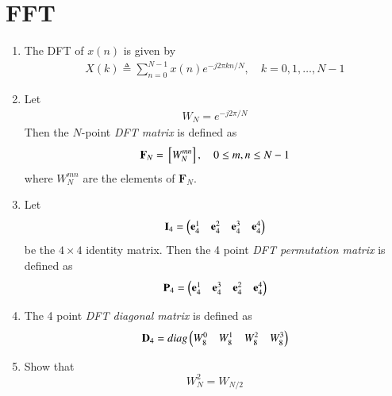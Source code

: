 \documentclass[journal,12pt,twocolumn]{IEEEtran}
\let\vec\mathbf
\renewcommand\thesection{\arabic{section}}
\begin{document}
\section{FFT}
\begin{enumerate}[label=\arabic*.,ref=\thesection.\theenumi]
    \item The DFT of $x(n)$ is given by
    \begin{align}
        X(k) \triangleq \sum_{n=0}^{N-1} x(n) e^{-j 2 \pi k n / N}, \quad k=0,1, \ldots, N-1
    \end{align}
\item Let 
	\begin{align}
W_{N} = e^{-j2\pi/N} 
	\end{align}
		Then the $N$-point {\em DFT matrix} is defined as 
	\begin{align}
		\vec{F}_{N} = \sbrak{W_{N}^{mn}}, \quad 0 \le m,n \le N-1 
	\end{align}
	where $W_{N}^{mn}$ are the elements of $\vec{F}_{N}$.
\item Let 
	\begin{align}
		\vec{I}_4 = \myvec{\vec{e}_4^{1} &\vec{e}_4^{2} &\vec{e}_4^{3} &\vec{e}_4^{4} }
	\end{align}
		be the $4\times 4$ identity matrix.  Then the 4 point {\em DFT permutation matrix} is defined as 
	\begin{align}
		\vec{P}_4 = \myvec{\vec{e}_4^{1} &\vec{e}_4^{3} &\vec{e}_4^{2} &\vec{e}_4^{4} }
	\end{align}
\item The 4 point {\em DFT diagonal matrix} is defined as 
	\begin{align}
		\vec{D}_4 = diag\myvec{W_{8}^{0} & W_{8}^{1} & W_{8}^{2} & W_{8}^{3}}
	\end{align}
\item Show that 
\begin{equation}
    W_{N}^{2}=W_{N/2}
\end{equation}


\end{enumerate}
\end{document}
